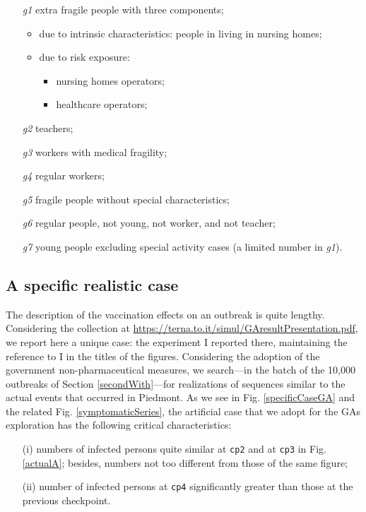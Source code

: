 \documentclass[graybox]{svmult}
\begin{document}
\begin{enumerate}
\item [\emph{g1}]
	extra fragile people with three components;
	\begin{itemize}
		\item due to intrinsic characteristics: people in living in nursing homes;
		\item due to risk exposure:
		\begin{itemize}
			\item nursing homes operators;
			\item healthcare operators;
 		\end{itemize} 
 	\end{itemize} 
\item [\emph{g2}]
	teachers;
\item [\emph{g3}]
	workers with medical fragility;
\item [\emph{g4}]
	regular workers;
\item [\emph{g5}]
	fragile people without special characteristics;
\item [\emph{g6}]
	regular people, not young, not worker, and not teacher;
\item [\emph{g7}]
	young people excluding special activity cases (a limited number in \emph{g1}).
\end{enumerate}


\subsection{A specific realistic case}
\label{specific}

The description of the vaccination effects on an outbreak is quite lengthy. Considering the collection at  \href{https://terna.to.it/simul/GAresultPresentation.pdf}{https://terna.to.it/simul/GAresultPresentation.pdf}, we report here a unique case: the experiment I reported there, maintaining the reference to I in the titles of the figures.
Considering the adoption of the government non-pharmaceutical measures, we search---in the batch of the 10,000 outbreaks of Section \ref{secondWith}---for realizations of sequences similar to the actual events that occurred in Piedmont. As we see in Fig. \ref{specificCaseGA} and the related Fig. \ref{symptomaticSeries}, the artificial case that we adopt for the GAs exploration has the following critical characteristics:

\begin{itemize}
\item [(i)] numbers of infected persons quite similar at \verb|cp2| and at \verb|cp3| in Fig. \ref{actualA}; besides, numbers not too different from those of the same figure;

\item [(ii)] number of infected persons at \verb|cp4| significantly greater than those at the previous checkpoint.
\end{itemize}
\end{document}
